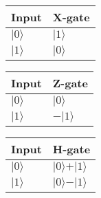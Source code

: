 \documentclass[DIV=12, english, fontsize=12pt, parskip=half]{scrartcl}
\begin{document}
		
	\centering 
	\begin{tabular}{|l|l|}
		\hline
		Input & X-gate \\ \hline
		$\vert 0 \rangle$ & $\vert 1 \rangle$ \\ \hline
		$\vert 1 \rangle$ & $\vert 0 \rangle$ \\ \hline
	\end{tabular}

	\begin{tabular}{|l|l|}
		\hline
		Input & Z-gate \\ \hline
		$\vert 0 \rangle$ & $\vert 0 \rangle$ \\ \hline
		$\vert 1 \rangle$ & $-\vert 1 \rangle$ \\ \hline
	\end{tabular}
 
	\begin{tabular}{|l|l|}
		\hline
		Input & H-gate \\ \hline
		$\vert 0 \rangle$ & $\vert 0 \rangle + \vert 1 \rangle$ \\ \hline
		$\vert 1 \rangle$ & $\vert 0 \rangle - \vert 1 \rangle$ \\ \hline
	\end{tabular}

	
	
\end{document}
